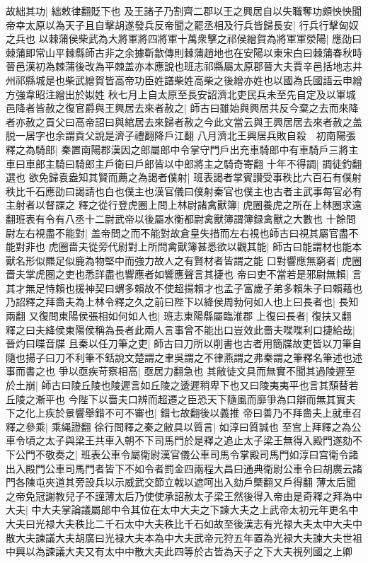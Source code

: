 故絀其功|{
	絀敕律翻貶下也}
及王諸子乃割齊二郡以王之興居自以失職奪功頗怏怏聞帝幸太原以為天子且自擊胡遂發兵反帝聞之罷丞相及行兵皆歸長安|{
	行兵行擊匈奴之兵也}
以棘蒲侯柴武為大將軍將四將軍十萬衆擊之祁侯繒賀為將軍軍滎陽|{
	應劭曰棘蒲即常山平棘縣師古非之余據靳歙傳則棘蒲趙地也在安陽以東宋白曰棘蒲春秋時晉邑漢初為棘蒲後改為平棘盖亦本應說也班志祁縣屬太原郡晉大夫賈辛邑括地志并州祁縣城是也柴武繒賀皆高帝功臣姓譜柴姓高柴之後繒亦姓也以國為氏國語云申繒方強韋昭注繒出於姒姓}
秋七月上自太原至長安詔濟北吏民兵未至先自定及以軍城邑降者皆赦之復官爵與王興居去來者赦之|{
	師古曰雖始與興居共反今棄之去而來降者亦赦之貢父曰高帝詔曰與綰居去來歸者赦之今此文當云與王興居居去來者赦之盖脱一居字也余謂貢父說是濟子禮翻降戶江翻}
八月濟北王興居兵敗自殺　初南陽張釋之為騎郎|{
	秦置南陽郡漢因之郎屬郎中令掌守門戶出充車騎郎中有車騎戶三將主車曰車郎主騎曰騎郎主戶衛曰戶郎皆以中郎將主之騎奇寄翻}
十年不得調|{
	調徒釣翻選也}
欲免歸袁盎知其賢而薦之為謁者僕射|{
	班表謁者掌賓讃受事秩比六百石有僕射秩比千石應劭曰謁請也白也僕主也漢官儀曰僕射秦官也僕主也古者主武事每官必有主射者以督課之}
釋之從行登虎圈上問上林尉諸禽獸簿|{
	虎圈養虎之所在上林圈求遠翻班表有令有八丞十二尉武帝以後屬水衡都尉禽獸簿謂簿録禽獸之大數也}
十餘問尉左右視盡不能對|{
	盖帝問之而不能對故倉皇失措而左右視也師古曰視其屬官盡不能對非也}
虎圈嗇夫從旁代尉對上所問禽獸簿甚悉欲以觀其能|{
	師古曰能謂材也能本獸名形似羆足似鹿為物堅中而強力故人之有賢材者皆謂之能}
口對響應無窮者|{
	虎圈嗇夫掌虎圈之吏也悉詳盡也響應者如響應聲言其捷也}
帝曰吏不當若是邪尉無賴|{
	言其才無足恃賴也援神契曰蝟多賴故不使超揚賴才也孟子富歲子弟多賴朱子曰賴藉也}
乃詔釋之拜嗇夫為上林令釋之久之前曰陛下以絳侯周勃何如人也上曰長者也|{
	長知兩翻}
又復問東陽侯張相如何如人也|{
	班志東陽縣屬臨淮郡}
上復曰長者|{
	復扶又翻}
釋之曰夫絳侯東陽侯稱為長者此兩人言事曾不能出口豈效此嗇夫喋喋利口捷給哉|{
	晉灼曰喋音牒}
且秦以任刀筆之吏|{
	師古曰刀所以削書也古者用簡牒故吏皆以刀筆自隨也揚子曰刀不利筆不銛說文楚謂之聿吳謂之不律燕謂之弗秦謂之筆釋名筆述也述事而書之也}
爭以亟疾苛察相高|{
	亟居力翻急也}
其敝徒文具而無實不聞其過陵遲至於土崩|{
	師古曰陵丘陵也陵遲言如丘陵之逶遲稍卑下也又曰陵夷夷平也言其頹替若丘陵之漸平也}
今陛下以嗇夫口辨而超遷之臣恐天下隨風而靡爭為口辯而無其實夫下之化上疾於景響舉錯不可不審也|{
	錯七故翻後以義推}
帝曰善乃不拜嗇夫上就車召釋之參乘|{
	乘䋲證翻}
徐行問釋之秦之敝具以質言|{
	如淳曰質誠也}
至宫上拜釋之為公車令頃之太子與梁王共車入朝不下司馬門於是釋之追止太子梁王無得入殿門遂劾不下公門不敬奏之|{
	班表公車令屬衛尉漢官儀公車司馬令掌殿司馬門如淳曰宫衛令諸出入殿門公車司馬門者皆下不如令者罰金四兩程大昌曰通典衛尉公車令曰胡廣云諸門各陳屯夾道其旁設兵以示威武交節立戟以遮呵出入劾戶槩翻又戶得翻}
薄太后聞之帝免冠謝教兒子不謹薄太后乃使使承詔赦太子梁王然後得入帝由是奇釋之拜為中大夫|{
	中大夫掌論議屬郎中令其位在太中大夫之下諫大夫之上武帝太初元年更名中大夫曰光禄大夫秩比二千石太中大夫秩比千石如故至後漢志有光禄大夫太中大夫中散大夫諫議大夫胡廣曰光禄大夫本為中大夫武帝元狩五年置為光禄大夫諫大夫世祖中興以為諫議大夫又有太中中散大夫此四等於古皆為天子之下大夫視列國之上卿}
